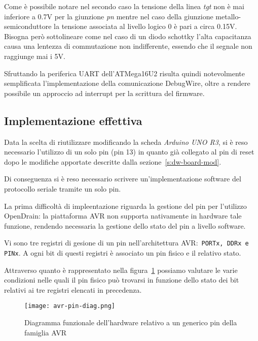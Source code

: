 Come è possibile notare nel secondo caso la tensione della linea \textit{tgt} non è mai inferiore a 0.7V per la giunzione \textit{pn} mentre nel caso della giunzione metallo-semiconduttore la tensione associata al livello logico 0 è pari a circa 0.15V. Bisogna però sottolineare come nel caso di un diodo schottky l'alta capacitanza causa una lentezza di commutazione non indifferente, essendo che il segnale non raggiunge mai i 5V. 


Sfruttando la periferica UART dell'ATMega16U2 risulta quindi notevolmente semplificata l'implementazione della comunicazione DebugWire, oltre a rendere possibile un approccio ad interrupt per la scrittura del firmware.

\subsection{Implementazione effettiva}

Data la scelta di riutilizzare modificando la scheda \textit{Arduino UNO R3}, si è reso necessario l'utilizzo di un solo pin (pin 13) in quanto già collegato al pin di reset dopo le modifiche apportate descritte dalla sezione~\ref{s:dw-board-mod}.

Di conseguenza si è reso necessario scrivere un'implementazione software del protocollo seriale tramite un solo pin.

La prima difficoltà di impleentazione riguarda la gestione del pin per l'utilizzo OpenDrain: la piattaforma AVR non supporta nativamente in hardware tale funzione, rendendo necessaria la gestione dello stato del pin a livello software.

Vi sono tre registri di gesione di un pin nell'architettura AVR:\ \texttt{PORTx, DDRx e PINx}. A ogni bit di questi registri è associato un pin fisico e il relativo stato.

Attraverso quanto è rappresentato nella figura~\ref{fig:avr-pin} possiamo valutare le varie condizioni nelle quali il pin fisico può trovarsi in funzione dello stato dei bit relativi ai tre registri elencati in precedenza.

\begin{figure}[t]
    \centering
    \texttt{[image: avr-pin-diag.png]}
    \caption[Immagine ottenuta dal documento\cite{avr:m16u2}, fig. 12-2]{Diagramma funzionale dell'hardware relativo a un generico pin della famiglia AVR\cite[fig. 12-2]{avr:m16u2}}\label{fig:avr-pin}
\end{figure}

